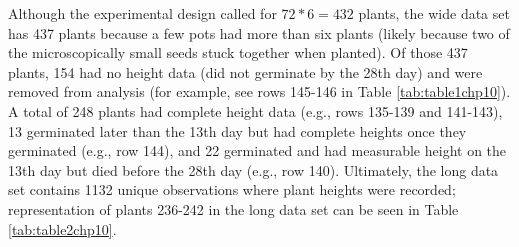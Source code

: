 \documentclass[
]{krantz}
\begin{document}
\begin{table}
\centering
\caption{\label{tab:table1chp10}A snapshot of data (Plants 231-246) from the Seed Germination case study in wide format.}
\centering
{}
\end{table}

Although the experimental design called for \(72*6=432\) plants, the wide data set has 437 plants because a few pots had more than six plants (likely because two of the microscopically small seeds stuck together when planted). Of those 437 plants, 154 had no height data (did not germinate by the 28th day) and were removed from analysis (for example, see rows 145-146 in Table \ref{tab:table1chp10}). A total of 248 plants had complete height data (e.g., rows 135-139 and 141-143), 13 germinated later than the 13th day but had complete heights once they germinated (e.g., row 144), and 22 germinated and had measurable height on the 13th day but died before the 28th day (e.g., row 140). Ultimately, the long data set contains 1132 unique observations where plant heights were recorded; representation of plants 236-242 in the long data set can be seen in Table \ref{tab:table2chp10}.
\end{document}
